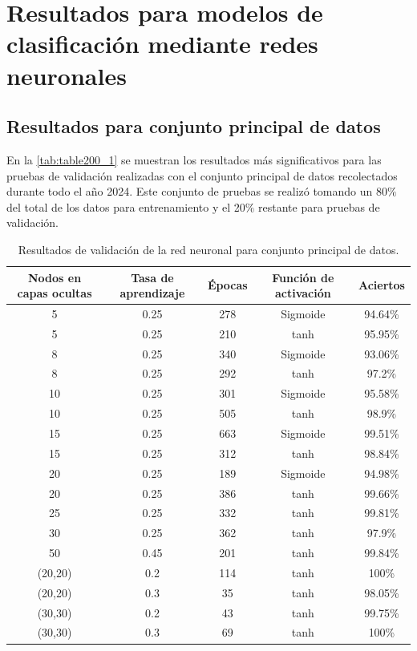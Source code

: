 \clearpage

\section{Resultados para modelos de clasificación mediante redes neuronales}

\subsection{Resultados para conjunto principal de datos}

En la \autoref{tab:table200_1} se muestran los resultados más significativos para las pruebas de validación realizadas con el conjunto principal de datos recolectados durante todo el año 2024. Este conjunto de pruebas se 
realizó tomando un 80$\%$ del total de los datos para entrenamiento y el 20$\%$ restante para pruebas de validación.

\begin{table}[h]
	\begin{center}
		\begin{tabular}{| c | c | c | c | c |}
	    	\hline
            Nodos en capas ocultas & Tasa de aprendizaje & Épocas & Función de activación & Aciertos \\ \hline
			5 & 0.25 & 278 & Sigmoide & 94.64\% \\
			5 & 0.25 & 210 & tanh & 95.95\% \\
			8 & 0.25 & 340 & Sigmoide & 93.06\% \\
			8 & 0.25 & 292 & tanh & 97.2\% \\
			10 & 0.25 & 301 & Sigmoide & 95.58\% \\
			10 & 0.25 & 505 & tanh & 98.9\% \\
			15 & 0.25 & 663 & Sigmoide & 99.51\% \\
			15 & 0.25 & 312 & tanh & 98.84\% \\
			20 & 0.25 & 189 & Sigmoide & 94.98\% \\
			20 & 0.25 & 386 & tanh & 99.66\% \\
			25 & 0.25 & 332 & tanh & 99.81\% \\
			30 & 0.25 & 362 & tanh & 97.9\% \\ 
			50 & 0.45 & 201 & tanh & 99.84\% \\
			(20,20) & 0.2 & 114 & tanh & 100\% \\
			(20,20) & 0.3 & 35 & tanh & 98.05\% \\
			(30,30) & 0.2 & 43 & tanh & 99.75\% \\
			(30,30) & 0.3 & 69 & tanh & 100\% \\ \hline
	    \end{tabular}	
		\caption{Resultados de validación de la red neuronal para conjunto principal de datos.}
        \label{tab:table200_1}	
	\end{center}
\end{table}

